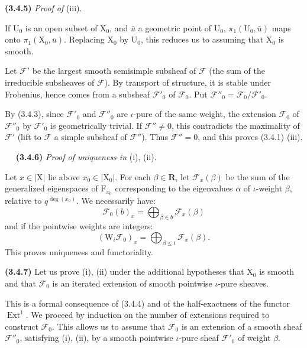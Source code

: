 \documentclass[11pt,leqno]{article}
\newcommand{\Page}[1]{\ifvmode\noindent\else\unskip\ \fi{\footnotesize\textcolor{gray}{[p.\,#1]}}\ \ignorespaces}
\begin{document}
\textbf{(3.4.5)} \textit{Proof of} (iii).

If \(\mathrm{U}_0\) is an open subset of \(\mathrm{X}_0\), and \(\bar{u}\) a geometric point of \(\mathrm{U}_0\), \(\pi_1(\mathrm{U}_0,\bar{u})\) maps onto \(\pi_1(\mathrm{X}_0,\bar{u})\). Replacing \(\mathrm{X}_0\) by \(\mathrm{U}_0\), this reduces us to assuming that \(\mathrm{X}_0\) is smooth.

Let \(\mathscr{F}'\) be the largest smooth semisimple subsheaf of \(\mathscr{F}\) (the sum of the irreducible subsheaves of \(\mathscr{F}\)). By transport of structure, it is stable under Frobenius, hence comes from a subsheaf \(\mathscr{F}'_0\) of \(\mathscr{F}_0\). Put \(\mathscr{F}''_0=\mathscr{F}_0/\mathscr{F}'_0\).

By (3.4.3), since \(\mathscr{F}'_0\) and \(\mathscr{F}''_0\) are \(\iota\)-pure of the same weight, the extension \(\mathscr{F}_0\) of \(\mathscr{F}''_0\) by \(\mathscr{F}'_0\) is geometrically trivial. If \(\mathscr{F}''\neq0\), this contradicts the maximality of \(\mathscr{F}'\) (lift to \(\mathscr{F}\) a simple subsheaf of \(\mathscr{F}''\)). Thus \(\mathscr{F}''=0\), and this proves (3.4.1) (iii).

\Page{209}
\textbf{(3.4.6)} \textit{Proof of uniqueness in} (i), (ii).

Let \(x\in|\mathrm X|\) lie above \(x_0\in|\mathrm X_0|\). For each \(\beta\in\mathbf R\), let \(\mathscr F_x(\beta)\) be the sum of the generalized eigenspaces of \(\mathrm F_{x_0}\) corresponding to the eigenvalues \(\alpha\) of \(\iota\)-weight \(\beta\), relative to \(q^{\deg(x_0)}\). We necessarily have:
\[
\mathscr F_0(b)_x=\bigoplus_{\beta\in b}\mathscr F_x(\beta)
\]
and if the pointwise weights are integers:
\[
(\mathrm W_i\mathscr F_0)_x=\bigoplus_{\beta\leq i}\mathscr F_x(\beta).
\]
This proves uniqueness and functoriality.

\textbf{(3.4.7)} Let us prove (i), (ii) under the additional hypotheses that \(\mathrm X_0\) is smooth and that \(\mathscr F_0\) is an iterated extension of smooth pointwise \(\iota\)-pure sheaves.

This is a formal consequence of (3.4.4) and of the half-exactness of the functor \(\operatorname{Ext}^1\). We proceed by induction on the number of extensions required to construct \(\mathscr F_0\). This allows us to assume that \(\mathscr F_0\) is an extension of a smooth sheaf \(\mathscr F''_0\), satisfying (i), (ii), by a smooth pointwise \(\iota\)-pure sheaf \(\mathscr F'_0\) of weight \(\beta\).
\end{document}
